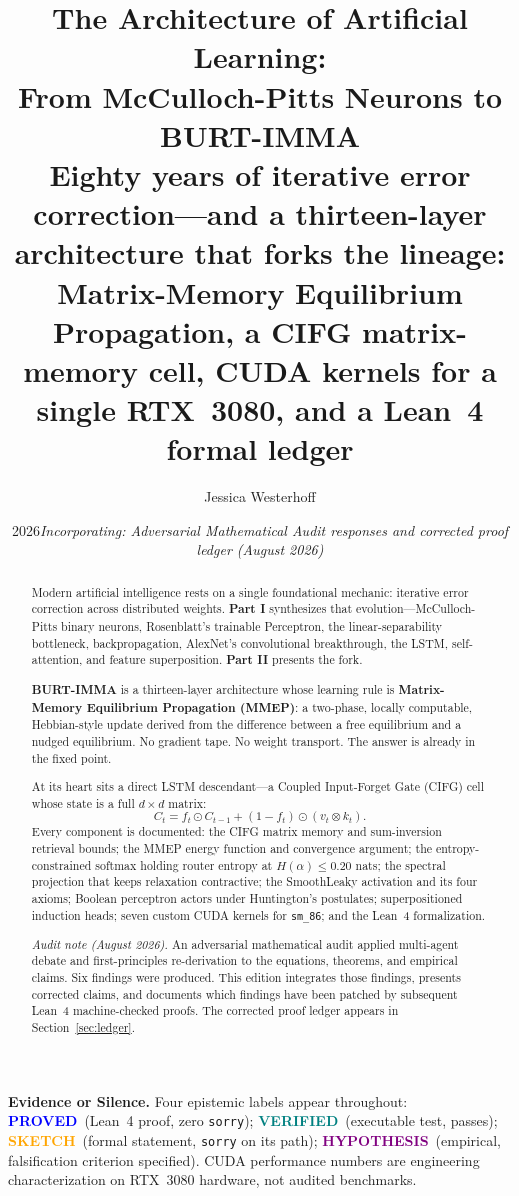 \documentclass[11pt,letterpaper]{article}
\title{\textbf{The Architecture of Artificial Learning:\\
From McCulloch-Pitts Neurons to BURT-IMMA}\\[6pt]
\large Eighty years of iterative error correction---and a thirteen-layer architecture
that forks the lineage: Matrix-Memory Equilibrium Propagation, a CIFG matrix-memory
cell, CUDA kernels for a single RTX~3080, and a Lean~4 formal ledger}
\author[1]{Jessica Westerhoff}
\affil[1]{Snap Kitty Collective $\cdot$ SnapKitty West\\
\texttt{jessica@collectivekitty.com}}
\date{2026\quad \textit{Incorporating: Adversarial Mathematical Audit responses
and corrected proof ledger (August 2026)}}
\newcommand{\PROVED}{\textbf{\textcolor{blue}{PROVED}}}
\newcommand{\VERIFIED}{\textbf{\textcolor{teal}{VERIFIED}}}
\newcommand{\SKETCH}{\textbf{\textcolor{orange}{SKETCH}}}
\newcommand{\HYPOTHESIS}{\textbf{\textcolor{purple}{HYPOTHESIS}}}
\begin{document}
\maketitle
\thispagestyle{empty}

\begin{notebox}
\textbf{Evidence or Silence.} Four epistemic labels appear throughout:
\PROVED\ (Lean~4 proof, zero \texttt{sorry});
\VERIFIED\ (executable test, passes);
\SKETCH\ (formal statement, \texttt{sorry} on its path);
\HYPOTHESIS\ (empirical, falsification criterion specified).
CUDA performance numbers are engineering characterization on RTX~3080 hardware,
not audited benchmarks.
\end{notebox}

\begin{abstract}
Modern artificial intelligence rests on a single foundational mechanic: iterative
error correction across distributed weights.  \textbf{Part I} synthesizes that
evolution---McCulloch-Pitts binary neurons, Rosenblatt's trainable Perceptron,
the linear-separability bottleneck, backpropagation, AlexNet's convolutional
breakthrough, the LSTM, self-attention, and feature superposition.
\textbf{Part II} presents the fork.

\textbf{BURT-IMMA} is a thirteen-layer architecture whose learning rule is
\textbf{Matrix-Memory Equilibrium Propagation (MMEP)}: a two-phase, locally
computable, Hebbian-style update derived from the difference between a free
equilibrium and a nudged equilibrium.  No gradient tape.  No weight transport.
The answer is already in the fixed point.

At its heart sits a direct LSTM descendant---a Coupled Input-Forget Gate (CIFG)
cell whose state is a full $d{\times}d$ matrix:
\[
C_t = f_t \odot C_{t-1} + (1-f_t) \odot (v_t \otimes k_t).
\]
Every component is documented: the CIFG matrix memory and sum-inversion
retrieval bounds; the MMEP energy function and convergence argument; the
entropy-constrained softmax holding router entropy at $H(\alpha) \leq 0.20$
nats; the spectral projection that keeps relaxation contractive; the SmoothLeaky
activation and its four axioms; Boolean perceptron actors under Huntington's
postulates; superpositioned induction heads; seven custom CUDA kernels for
\texttt{sm\_86}; and the Lean~4 formalization.

\medskip
\noindent\textit{Audit note (August 2026).}
An adversarial mathematical audit applied multi-agent debate and
first-principles re-derivation to the equations, theorems, and empirical claims.
Six findings were produced.  This edition integrates those findings, presents
corrected claims, and documents which findings have been patched by subsequent
Lean~4 machine-checked proofs.  The corrected proof ledger appears in
Section~\ref{sec:ledger}.
\end{abstract}
\end{document}
